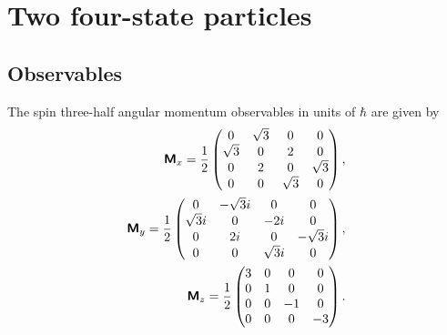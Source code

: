 \documentclass[%
  twocolumn,
 showpacs,
 showkeys,
 preprintnumbers,
 amsmath,amssymb,
 aps,
  pra,
  longbibliography,
 floatfix,
 ]{revtex4-1}
\begin{document}


\section{Two four-state particles}


\subsection{Observables}
The spin three-half angular momentum observables in units of $\hbar$ are given by~\cite{schiff-55}
\begin{equation}
\begin{split}
\textsf{\textbf{M}}_x=
\frac{1}{2}
\begin{pmatrix}
0&\sqrt{3}&0&0\\
\sqrt{3}&0&2&0\\
0&2&0&\sqrt{3}\\
0&0&\sqrt{3}&0
\end{pmatrix}  , \\
\textsf{\textbf{M}}_y=
\frac{1}{2}
\begin{pmatrix}
0&-\sqrt{3}i&0&0\\
\sqrt{3}i&0&-2i&0\\
0&2i&0&-\sqrt{3}i\\
0&0&\sqrt{3}i&0
\end{pmatrix}   ,    \\
\textsf{\textbf{M}}_z=
\frac{1}{2}
\begin{pmatrix}
3&0&0&0\\
0&1&0&0\\
0&0&-1&0\\
0&0&0&-3
\end{pmatrix}  .
\end{split}
\end{equation}
\end{document}
